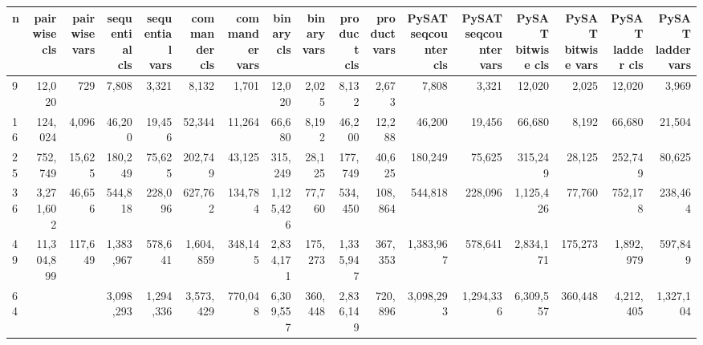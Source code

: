 \begin{tabular}{lrrrrrrrrrrrrrrrr}
\toprule
n & pairwise cls & pairwise vars & sequential cls & sequential vars & commander cls & commander vars & binary cls & binary vars & product cls & product vars & PySAT seqcounter cls & PySAT seqcounter vars & PySAT bitwise cls & PySAT bitwise vars & PySAT ladder cls & PySAT ladder vars \\
\midrule
9 & 12,020 & 729 & 7,808 & 3,321 & 8,132 & 1,701 & 12,020 & 2,025 & 8,132 & 2,673 & 7,808 & 3,321 & 12,020 & 2,025 & 12,020 & 3,969 \\
16 & 124,024 & 4,096 & 46,200 & 19,456 & 52,344 & 11,264 & 66,680 & 8,192 & 46,200 & 12,288 & 46,200 & 19,456 & 66,680 & 8,192 & 66,680 & 21,504 \\
25 & 752,749 & 15,625 & 180,249 & 75,625 & 202,749 & 43,125 & 315,249 & 28,125 & 177,749 & 40,625 & 180,249 & 75,625 & 315,249 & 28,125 & 252,749 & 80,625 \\
36 & 3,271,602 & 46,656 & 544,818 & 228,096 & 627,762 & 134,784 & 1,125,426 & 77,760 & 534,450 & 108,864 & 544,818 & 228,096 & 1,125,426 & 77,760 & 752,178 & 238,464 \\
49 & 11,304,899 & 117,649 & 1,383,967 & 578,641 & 1,604,859 & 348,145 & 2,834,171 & 175,273 & 1,335,947 & 367,353 & 1,383,967 & 578,641 & 2,834,171 & 175,273 & 1,892,979 & 597,849 \\
64 &  &  & 3,098,293 & 1,294,336 & 3,573,429 & 770,048 & 6,309,557 & 360,448 & 2,836,149 & 720,896 & 3,098,293 & 1,294,336 & 6,309,557 & 360,448 & 4,212,405 & 1,327,104 \\
\bottomrule
\end{tabular}
